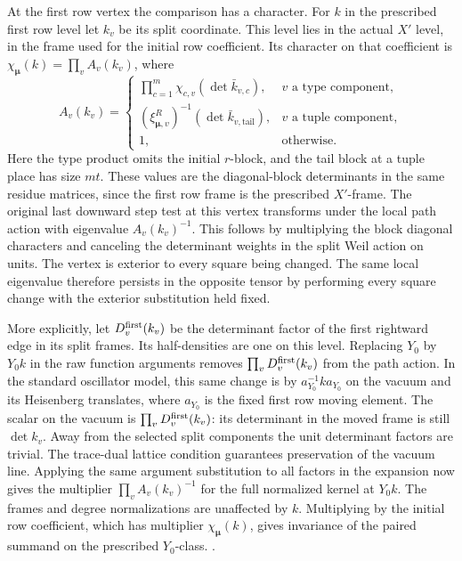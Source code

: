 At the first row vertex the comparison has a character.
For \(k\) in the prescribed first row level let \(k_v\)
be its split coordinate. This level lies in the actual
\(X'\) level, in the frame used for the initial row
coefficient. Its character on that coefficient is
\(\chi_{\boldsymbol\mu}(k)=\prod_v A_v(k_v)\), where
\[
 A_v(k_v)=
 \begin{cases}
  \displaystyle\prod_{c=1}^m \chi_{c,v}(\det\bar k_{v,c}),
               &v\text{ a type component},\\
  (\xi_{\boldsymbol\mu,v}^{R})^{-1}
                      (\det\bar k_{v,\mathrm{tail}}),
               &v\text{ a tuple component},\\
  1,&\text{otherwise}.
 \end{cases}
\]
Here the type product omits the initial \(r\)-block, and
the tail block at a tuple place has size \(mt\). These
values are the diagonal-block determinants in the same
residue matrices, since the first row frame is the
prescribed \(X'\)-frame. The original last downward
step test at this vertex transforms under the local
path action with eigenvalue \(A_v(k_v)^{-1}\).
This follows by multiplying the block diagonal
characters and canceling the determinant weights
in the split Weil action on units. The vertex is
exterior to every square being changed. The same
local eigenvalue therefore persists in the opposite
tensor by performing every square change with the
exterior substitution held fixed.

More explicitly, let \(D^{\rm first}_v(k_v)\) be the
determinant factor of the first rightward edge
in its split frames. Its half-densities are one
on this level. Replacing \(Y_0\) by \(Y_0k\) in
the raw function arguments removes
\(\prod_vD^{\rm first}_v(k_v)\) from the path
action. In the standard oscillator model, this
same change is by \(a_{Y_0}^{-1}ka_{Y_0}\)
on the vacuum and its Heisenberg translates, where
\(a_{Y_0}\) is the fixed first row moving element.
The scalar on the vacuum is
\(\prod_vD^{\rm first}_v(k_v)\): its determinant in
the moved frame is still \(\det k_v\). Away from the selected
split components the unit determinant factors are trivial.
The trace-dual lattice
condition guarantees preservation of the vacuum
line. Applying the same argument substitution to
all factors in the expansion now gives the multiplier
\(\prod_v A_v(k_v)^{-1}\) for the full normalized
kernel at \(Y_0k\). The frames and degree normalizations
are unaffected by \(k\). Multiplying by the initial
row coefficient, which has multiplier
\(\chi_{\boldsymbol\mu}(k)\), gives invariance of the
paired summand on the prescribed \(Y_0\)-class.
.


